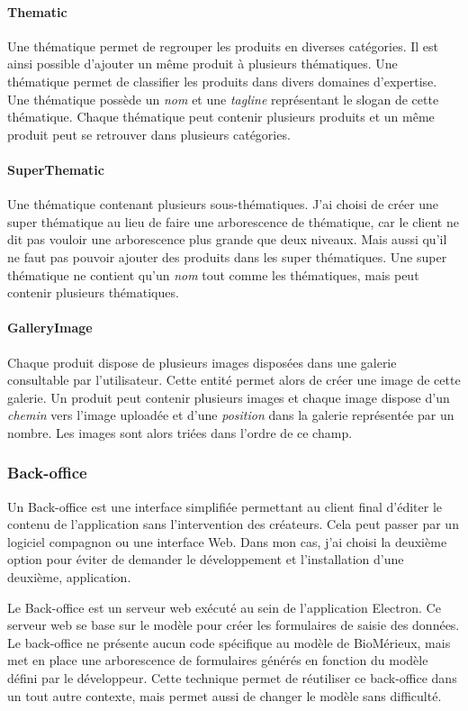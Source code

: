 \paragraph{Thematic} Une thématique permet de regrouper les produits en diverses catégories.
Il est ainsi possible d'ajouter un même produit à plusieurs thématiques.
Une thématique permet de classifier les produits dans divers domaines d'expertise.
Une thématique possède un \emph{nom} et une \emph{tagline} représentant le slogan de cette thématique.
Chaque thématique peut contenir plusieurs produits et un même produit peut se retrouver dans plusieurs catégories.

\paragraph{SuperThematic} Une thématique contenant plusieurs sous-thématiques.
J'ai choisi de créer une super thématique au lieu de faire une arborescence de thématique, car le client ne dit pas vouloir une arborescence plus grande que deux niveaux.
Mais aussi qu'il ne faut pas pouvoir ajouter des produits dans les super thématiques.
Une super thématique ne contient qu'un \emph{nom} tout comme les thématiques, mais peut contenir plusieurs thématiques.

\paragraph{GalleryImage} Chaque produit dispose de plusieurs images disposées dans une galerie consultable par l'utilisateur.
Cette entité permet alors de créer une image de cette galerie.
Un produit peut contenir plusieurs images et chaque image dispose d'un \emph{chemin} vers l'image uploadée et d'une \emph{position} dans la galerie représentée par un nombre.
Les images sont alors triées dans l'ordre de ce champ.

\subsubsection{Back-office}

Un Back-office est une interface simplifiée permettant au client final d'éditer le contenu de l'application sans l'intervention des créateurs.
Cela peut passer par un logiciel compagnon ou une interface Web.
Dans mon cas, j'ai choisi la deuxième option pour éviter de demander le développement et l'installation d'une deuxième, application.

Le Back-office est un serveur web exécuté au sein de l'application Electron.
Ce serveur web se base sur le modèle pour créer les formulaires de saisie des données.
Le back-office ne présente aucun code spécifique au modèle de BioMérieux, mais met en place une arborescence de formulaires générés en fonction du modèle défini par le développeur.
Cette technique permet de réutiliser ce back-office dans un tout autre contexte, mais permet aussi de changer le modèle sans difficulté.

